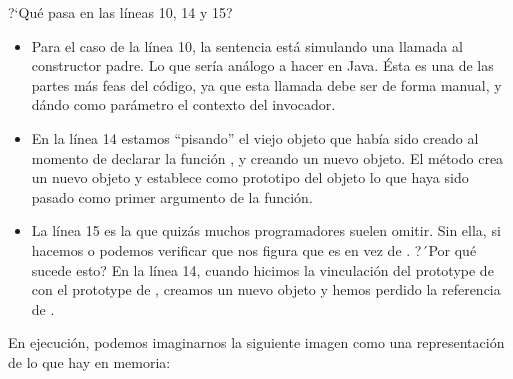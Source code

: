 ?`Qué pasa en las líneas 10, 14 y 15? 
\begin{itemize}
\item Para el caso de la línea 10, la sentencia  está simulando una llamada al constructor padre. Lo que sería análogo a hacer  en Java. Ésta es una de las partes más feas del código, ya que esta llamada debe ser de forma manual, y dándo como parámetro el contexto del invocador.
\item En la línea 14 estamos "`pisando"' el viejo objeto  que había sido creado al momento de declarar la función , y creando un nuevo objeto. El método  crea un nuevo objeto y establece como prototipo del objeto lo que haya sido pasado como primer argumento de la función.
\item La línea 15 es la que quizás muchos programadores suelen omitir. Sin ella, si hacemos  o  podemos verificar que nos figura que  es  en vez de . ?´Por qué sucede esto? En la línea 14, cuando hicimos la vinculación del prototype de  con el prototype de , creamos un nuevo objeto y hemos perdido la referencia de .
\end{itemize}

En ejecución, podemos imaginarnos la siguiente imagen como una representación de lo que hay en memoria:

\newpage

